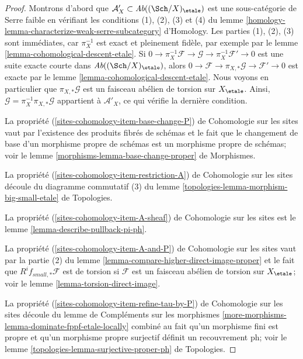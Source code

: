 \begin{proof}
Montrons d'abord que $\mathcal{A}'_X \subset \textit{Ab}((\Sch/X)_\etale)$
est une sous-catégorie de Serre faible en vérifiant les conditions (1), (2), (3) et (4)
du lemme \ref{homology-lemma-characterize-weak-serre-subcategory} d'Homology.
Les parties (1), (2), (3) sont immédiates, car $\pi_X^{-1}$ est exact et
pleinement fidèle, par exemple par le lemme \ref{lemma-cohomological-descent-etale}. Si
$0 \to \pi_X^{-1}\mathcal{F} \to \mathcal{G} \to \pi_X^{-1}\mathcal{F}' \to 0$
est une suite exacte courte dans $\textit{Ab}((\Sch/X)_\etale)$,
alors $0 \to \mathcal{F} \to \pi_{X, *}\mathcal{G} \to \mathcal{F}' \to 0$
est exacte par le lemme \ref{lemma-cohomological-descent-etale}.
Nous voyons en particulier que $\pi_{X, *}\mathcal{G}$ est un faisceau
abélien de torsion sur $X_\etale$.
Ainsi, $\mathcal{G} = \pi_X^{-1}\pi_{X, *}\mathcal{G}$ appartient à
$\mathcal{A}'_X$, ce qui vérifie la dernière condition.

\medskip\noindent
La propriété (\ref{sites-cohomology-item-base-change-P}) de Cohomologie sur les sites vaut
par l'existence des produits fibrés de schémas
et le fait que le changement de base d'un morphisme propre de
schémas est un morphisme propre de schémas; voir le
lemme \ref{morphisms-lemma-base-change-proper} de Morphismes.

\medskip\noindent
La propriété (\ref{sites-cohomology-item-restriction-A}) de Cohomologie sur les sites
découle du diagramme commutatif (3) du
lemme \ref{topologies-lemma-morphism-big-small-etale} de Topologies.

\medskip\noindent
La propriété (\ref{sites-cohomology-item-A-sheaf}) de Cohomologie sur les sites est le
lemme \ref{lemma-describe-pullback-pi-ph}.

\medskip\noindent
La propriété (\ref{sites-cohomology-item-A-and-P}) de Cohomologie sur les sites vaut par la
partie (2) du lemme \ref{lemma-compare-higher-direct-image-proper}
et le fait que $R^if_{small, *}\mathcal{F}$
est de torsion si $\mathcal{F}$ est un faisceau
abélien de torsion sur $X_\etale$; voir le lemme \ref{lemma-torsion-direct-image}.

\medskip\noindent
La propriété (\ref{sites-cohomology-item-refine-tau-by-P}) de Cohomologie sur les sites
découle du lemme de Compléments sur les morphismes
\ref{more-morphisms-lemma-dominate-fppf-etale-locally}
combiné au fait qu'un morphisme fini est propre
et qu'un morphisme propre surjectif définit un recouvrement ph; voir le
lemme \ref{topologies-lemma-surjective-proper-ph} de Topologies.
\end{proof}

